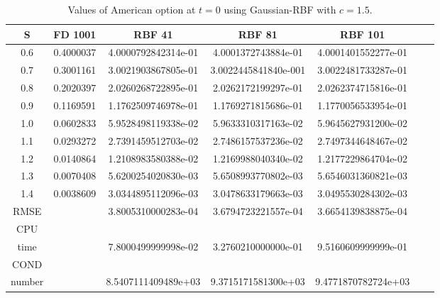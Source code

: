 \documentclass[12pt]{article}
\numberwithin{equation}{section} %
\begin{document}
\begin{table}[h]
\centering
\begin{tabular}{|c|c|c|c|c|c|c|}
  \hline
  S & FD 1001  & RBF 41 & RBF 81 & RBF 101 \\
  \hline
  0.6 & 0.4000037 &     4.0000792842314e-01 & 4.0001372743884e-01 & 4.0001401552277e-01 \\
  0.7 & 0.3001161  &3.0021903867805e-01  &3.0022445841840e-001 & 3.0022481733287e-01\\
  0.8 & 0.2020397  & 2.0260268722895e-01 & 2.0262172199297e-01 &  2.0262374715816e-01\\
  0.9 & 0.1169591  & 1.1762509746978e-01 & 1.1769271815686e-01 &   1.1770056533954e-01\\
  1.0 & 0.0602833  & 5.9528498119338e-02 & 5.9633310317163e-02 &  5.9645627931200e-02 \\
  1.1 & 0.0293272  & 2.7391459512703e-02 &  2.7486157537236e-02 &   2.7497344648467e-02\\
  1.2 & 0.0140864  & 1.2108983580388e-02  &  1.2169988040340e-02 & 1.2177229864704e-02 \\
  1.3 & 0.0070408  &5.6200254020830e-03   &  5.6508993770802e-03 & 5.6546031360821e-03 \\
  1.4 & 0.0038609  &3.0344895112096e-03& 3.0478633179663e-03 &  3.0495530284302e-03\\
  \hline
  RMSE &   &3.8005310000283e-04  &  3.6794723221557e-04 &  3.6654139838875e-04 \\
  \hline
  CPU &   &  &  &  \\
  time  &   & 7.8000499999998e-02 & 3.2760210000000e-01 & 9.5160609999999e-01 \\
  \hline
   COND &   &  &  &  \\
  number  &   & 8.5407111409489e+03 &  9.3715171581300e+03& 9.4771870782724e+03 \\
  \hline
\end{tabular}
  \caption{Values of American option at $t=0$ using Gaussian-RBF with $c=1.5$.}\label{Tab_1DFinal}
\end{table}
\end{document}
